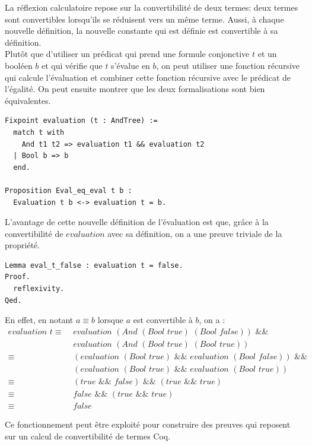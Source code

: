 \documentclass[11pt]{article}
\begin{document}
La réflexion calculatoire repose sur la convertibilité de deux termes: deux termes sont convertibles lorsqu'ils se réduisent vers un même terme. Aussi, à chaque nouvelle définition, la nouvelle constante qui est définie est convertible à sa définition. \\

Plutôt que d'utiliser un prédicat qui prend une formule conjonctive $t$ et un booléen $b$ et qui vérifie que $t$ s'évalue en $b$, on peut utiliser une fonction récursive qui calcule l'évaluation et combiner cette fonction récursive avec le prédicat de l'égalité. On peut ensuite montrer que les deux formalisations sont bien équivalentes.  
\begin{lstlisting}[frame=single]
Fixpoint evaluation (t : AndTree) :=
  match t with
    And t1 t2 => evaluation t1 && evaluation t2
  | Bool b => b
  end.
  
Proposition Eval_eq_eval t b :
  Evaluation t b <-> evaluation t = b.
\end{lstlisting}

L'avantage de cette nouvelle définition de l'évaluation est que, grâce à la convertibilité de $evaluation$ avec sa définition, on a une preuve triviale de la propriété.
\begin{lstlisting}[frame=single]
Lemma eval_t_false : evaluation t = false.
Proof.
  reflexivity.
Qed.
\end{lstlisting}

En effet, en notant $a \equiv b$ lorsque $a$ est convertible à $b$, on a :
\begin{align*}
  evaluation \,\,t \equiv \,\, &evaluation\,\, (And \,\,(Bool \,\,true) \,\,(Bool \,\,false)) \,\,\&\& \,\, \\
  \,\, &evaluation\,\, (And \,\,(Bool\,\, true) \,\,(Bool\,\, true)) \\
  \equiv \,\, &(evaluation \,\,(Bool \,\,true) \,\,\&\&\,\, evaluation \,\,(Bool \,\,false)) \,\,\&\&\,\, \\
  &(evaluation\,\, (Bool \,\,true) \,\,\&\&\,\, evaluation \,\,(Bool\,\, true)) \\
  \equiv \,\, &(true \,\,\&\&\,\, false) \,\,\&\&\,\, (true \,\,\&\&\,\, true) \\
  \equiv\,\, &false \,\,\&\&\,\, (true \,\,\&\&\,\, true) \\
  \equiv\,\, &false
\end{align*}  

Ce fonctionnement peut être exploité pour construire des preuves qui reposent sur un calcul de convertibilité de termes Coq.
\end{document}
